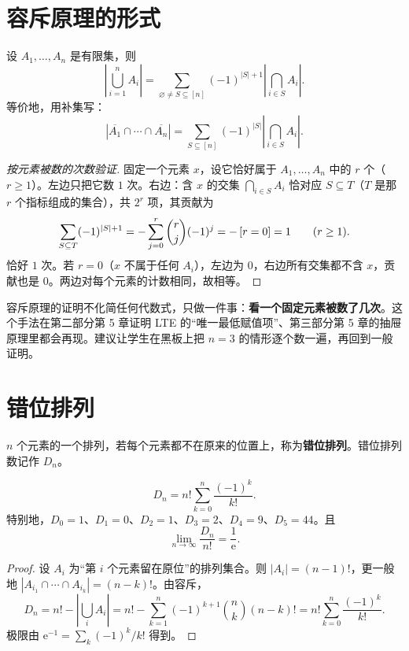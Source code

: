 \section{容斥原理的形式}
\begin{theorem}[容斥原理]
设 $A_1,\ldots,A_n$ 是有限集，则
\[
\left|\bigcup_{i=1}^{n}A_i\right|
=\sum_{\varnothing\ne S\subseteq[n]}(-1)^{|S|+1}\left|\bigcap_{i\in S}A_i\right|.
\]
等价地，用补集写：
\[
\left|\overline{A_1}\cap\cdots\cap\overline{A_n}\right|
=\sum_{S\subseteq[n]}(-1)^{|S|}\left|\bigcap_{i\in S}A_i\right|.
\]
\end{theorem}
\begin{proof}[按元素被数的次数验证]
固定一个元素 $x$，设它恰好属于 $A_1,\ldots,A_n$ 中的 $r$ 个（$r\ge1$）。左边只把它数 $1$ 次。右边：含 $x$ 的交集 $\bigcap_{i\in S}A_i$ 恰对应 $S\subseteq T$（$T$ 是那 $r$ 个指标组成的集合），共 $2^r$ 项，其贡献为
\[
\sum_{S\subseteq T}(-1)^{|S|+1}=-\sum_{j=0}^{r}\binom rj(-1)^j=-\left[r=0\right]=1\qquad(r\ge1).
\]
恰好 $1$ 次。若 $r=0$（$x$ 不属于任何 $A_i$），左边为 $0$，右边所有交集都不含 $x$，贡献也是 $0$。两边对每个元素的计数相同，故相等。
\end{proof}

\begin{teach}[这个证明值得反复讲]
容斥原理的证明不化简任何代数式，只做一件事：\textbf{看一个固定元素被数了几次}。这个手法在第二部分第 5 章证明 LTE 的“唯一最低赋值项”、第三部分第 5 章的抽屉原理里都会再现。建议让学生在黑板上把 $n=3$ 的情形逐个数一遍，再回到一般证明。
\end{teach}

\section{错位排列}
\begin{definition}[错位排列]
$n$ 个元素的一个排列，若每个元素都不在原来的位置上，称为\textbf{错位排列}。错位排列数记作 $D_n$。
\end{definition}
\begin{theorem}[错位排列数]
\[
D_n=n!\sum_{k=0}^{n}\frac{(-1)^k}{k!}.
\]
特别地，$D_0=1$、$D_1=0$、$D_2=1$、$D_3=2$、$D_4=9$、$D_5=44$。且
\[
\lim_{n\to\infty}\frac{D_n}{n!}=\frac1{\mathrm e}.
\]
\end{theorem}
\begin{proof}
设 $A_i$ 为“第 $i$ 个元素留在原位”的排列集合。则 $|A_i|=(n-1)!$，更一般地 $|A_{i_1}\cap\cdots\cap A_{i_k}|=(n-k)!$。由容斥，
\[
D_n=n!-\left|\bigcup_i A_i\right|
=n!-\sum_{k=1}^{n}(-1)^{k+1}\binom nk(n-k)!
=n!\sum_{k=0}^{n}\frac{(-1)^k}{k!}.
\]
极限由 $\mathrm e^{-1}=\sum_k(-1)^k/k!$ 得到。
\end{proof}

